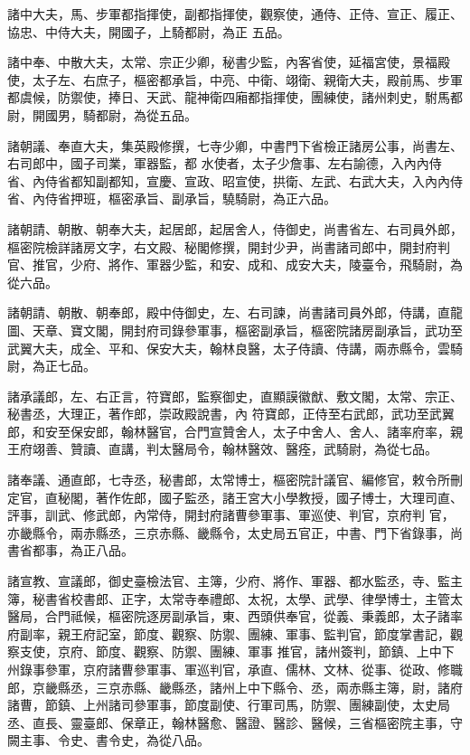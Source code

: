 \begin{pinyinscope}
 諸中大夫，馬、步軍都指揮使，副都指揮使，觀察使，通侍、正侍、宣正、履正、協忠、中侍大夫，開國子，上騎都尉，為正
 五品。



 諸中奉、中散大夫，太常、宗正少卿，秘書少監，內客省使，延福宮使，景福殿使，太子左、右庶子，樞密都承旨，中亮、中衛、翊衛、親衛大夫，殿前馬、步軍都虞候，防禦使，捧日、天武、龍神衛四廂都指揮使，團練使，諸州刺史，駙馬都尉，開國男，騎都尉，為從五品。



 諸朝議、奉直大夫，集英殿修撰，七寺少卿，中書門下省檢正諸房公事，尚書左、右司郎中，國子司業，軍器監，都
 水使者，太子少詹事、左右諭德，入內內侍省、內侍省都知副都知，宣慶、宣政、昭宣使，拱衛、左武、右武大夫，入內內侍省、內侍省押班，樞密承旨、副承旨，驍騎尉，為正六品。



 諸朝請、朝散、朝奉大夫，起居郎，起居舍人，侍御史，尚書省左、右司員外郎，樞密院檢詳諸房文字，右文殿、秘閣修撰，開封少尹，尚書諸司郎中，開封府判官、推官，少府、將作、軍器少監，和安、成和、成安大夫，陵臺令，飛騎尉，為
 從六品。



 諸朝請、朝散、朝奉郎，殿中侍御史，左、右司諫，尚書諸司員外郎，侍講，直龍圖、天章、寶文閣，開封府司錄參軍事，樞密副承旨，樞密院諸房副承旨，武功至武翼大夫，成全、平和、保安大夫，翰林良醫，太子侍讀、侍講，兩赤縣令，雲騎尉，為正七品。



 諸承議郎，左、右正言，符寶郎，監察御史，直顯謨徽猷、敷文閣，太常、宗正、秘書丞，大理正，著作郎，崇政殿說書，內
 符寶郎，正侍至右武郎，武功至武翼郎，和安至保安郎，翰林醫官，合門宣贊舍人，太子中舍人、舍人、諸率府率，親王府翊善、贊讀、直講，判太醫局令，翰林醫效、醫痊，武騎尉，為從七品。



 諸奉議、通直郎，七寺丞，秘書郎，太常博士，樞密院計議官、編修官，敕令所刪定官，直秘閣，著作佐郎，國子監丞，諸王宮大小學教授，國子博士，大理司直、評事，訓武、修武郎，內常侍，開封府諸曹參軍事、軍巡使、判官，京府判
 官，亦畿縣令，兩赤縣丞，三京赤縣、畿縣令，太史局五官正，中書、門下省錄事，尚書省都事，為正八品。



 諸宣教、宣議郎，御史臺檢法官、主簿，少府、將作、軍器、都水監丞，寺、監主簿，秘書省校書郎、正字，太常寺奉禮郎、太祝，太學、武學、律學博士，主管太醫局，合門祗候，樞密院逐房副承旨，東、西頭供奉官，從義、秉義郎，太子諸率府副率，親王府記室，節度、觀察、防禦、團練、軍事、監判官，節度掌書記，觀察支使，京府、節度、觀察、防禦、團練、軍事
 推官，諸州簽判，節鎮、上中下州錄事參軍，京府諸曹參軍事、軍巡判官，承直、儒林、文林、從事、從政、修職郎，京畿縣丞，三京赤縣、畿縣丞，諸州上中下縣令、丞，兩赤縣主簿，尉，諸府諸曹，節鎮、上州諸司參軍事，節度副使、行軍司馬，防禦、團練副使，太史局丞、直長、靈臺郎、保章正，翰林醫愈、醫證、醫診、醫候，三省樞密院主事，守闕主事、令史、書令史，為從八品。




\end{pinyinscope}
